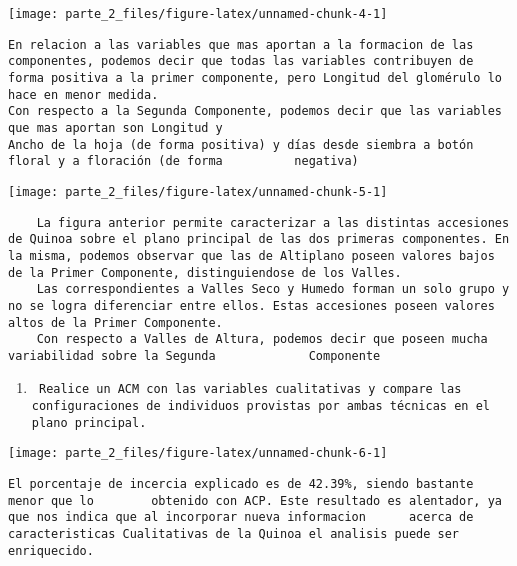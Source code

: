 \documentclass[
]{article}
\begin{document}
\begin{center}\texttt{[image: parte\_2\_files/figure-latex/unnamed-chunk-4-1]} \end{center}

\begin{verbatim}
En relacion a las variables que mas aportan a la formacion de las componentes, podemos decir que todas las variables contribuyen de forma positiva a la primer componente, pero Longitud del glomérulo lo hace en menor medida.
Con respecto a la Segunda Componente, podemos decir que las variables que mas aportan son Longitud y 
Ancho de la hoja (de forma positiva) y días desde siembra a botón floral y a floración (de forma          negativa)
\end{verbatim}

\begin{center}\texttt{[image: parte\_2\_files/figure-latex/unnamed-chunk-5-1]} \end{center}

\begin{verbatim}
    La figura anterior permite caracterizar a las distintas accesiones de Quinoa sobre el plano principal de las dos primeras componentes. En la misma, podemos observar que las de Altiplano poseen valores bajos de la Primer Componente, distinguiendose de los Valles. 
    Las correspondientes a Valles Seco y Humedo forman un solo grupo y no se logra diferenciar entre ellos. Estas accesiones poseen valores altos de la Primer Componente.
    Con respecto a Valles de Altura, podemos decir que poseen mucha variabilidad sobre la Segunda             Componente
\end{verbatim}

\begin{enumerate}
\def\labelenumi{\Alph{enumi})}
\item
\begin{verbatim}
 Realice un ACM con las variables cualitativas y compare las configuraciones de individuos provistas por ambas técnicas en el plano principal.
\end{verbatim}
\end{enumerate}

\begin{center}\texttt{[image: parte\_2\_files/figure-latex/unnamed-chunk-6-1]} \end{center}

\begin{verbatim}
El porcentaje de incercia explicado es de 42.39%, siendo bastante menor que lo        obtenido con ACP. Este resultado es alentador, ya que nos indica que al incorporar nueva informacion      acerca de caracteristicas Cualitativas de la Quinoa el analisis puede ser enriquecido.
\end{verbatim}
\end{document}
